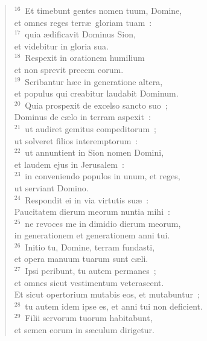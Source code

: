 \begin{flushleft}
\begin{verse}
${}^{16}$~Et timebunt gentes nomen tuum, Domine,\\ et omnes reges terr\ae\ gloriam tuam~:\\
${}^{17}$~quia \ae dificavit Dominus Sion,\\ et videbitur in gloria sua.\\
${}^{18}$~Respexit in orationem humilium\\ et non sprevit precem eorum.\\
${}^{19}$~Scribantur h\ae c in generatione altera,\\ et populus qui creabitur laudabit Dominum.\\
${}^{20}$~Quia prospexit de excelso sancto suo~;\\ Dominus de c\ae lo in terram aspexit~:\\
${}^{21}$~ut audiret gemitus compeditorum~;\\ ut solveret filios interemptorum~:\\
${}^{22}$~ut annuntient in Sion nomen Domini,\\ et laudem ejus in Jerusalem~:\\
${}^{23}$~in conveniendo populos in unum, et reges,\\ ut serviant Domino.\\
${}^{24}$~Respondit ei in via virtutis su\ae~:\\ Paucitatem dierum meorum nuntia mihi~:\\
${}^{25}$~ne revoces me in dimidio dierum meorum,\\ in generationem et generationem anni tui.\\
${}^{26}$~Initio tu, Domine, terram fundasti,\\ et opera manuum tuarum sunt c\ae li.\\
${}^{27}$~Ipsi peribunt, tu autem permanes~;\\ et omnes sicut vestimentum veterascent.\\ Et sicut opertorium mutabis eos, et mutabuntur~;\\
${}^{28}$~tu autem idem ipse es, et anni tui non deficient.\\
${}^{29}$~Filii servorum tuorum habitabunt,\\ et semen eorum in s\ae culum dirigetur.\end{verse}\end{flushleft}



